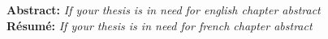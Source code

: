 \textbf{Abstract:} \hspace{0.5cm}
\textit{
If your thesis is in need for english chapter abstract
}
\\

\noindent \textbf{Résumé:} \hspace{0.5cm}
\textit{
If your thesis is in need for french chapter abstract}

